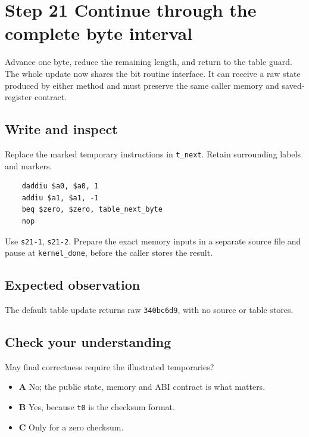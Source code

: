\section{Step 21 Continue through the complete byte interval}\label{crc-s21}

Advance one byte, reduce the remaining length, and return to the table guard. The whole update now shares the bit routine interface. It can receive a raw state produced by either method and must preserve the same caller memory and saved-register contract.

\subsection{Write and inspect}
Replace the marked temporary instructions in \texttt{t\_next}. Retain surrounding labels and markers.

\begin{verbatim}
    daddiu $a0, $a0, 1
    addiu $a1, $a1, -1
    beq $zero, $zero, table_next_byte
    nop
\end{verbatim}

Use \texttt{s21-1}, \texttt{s21-2}. Prepare the exact memory inputs in a separate source file and pause at \texttt{kernel\_done}, before the caller stores the result.

\subsection{Expected observation}
The default table update returns raw \texttt{340bc6d9}, with no source or table stores.

\subsection{Check your understanding}
May final correctness require the illustrated temporaries?

\begin{itemize}
  \item \textbf{A} No; the public state, memory and ABI contract is what matters.
  \item \textbf{B} Yes, because \texttt{t0} is the checksum format.
  \item \textbf{C} Only for a zero checksum.
\end{itemize}
